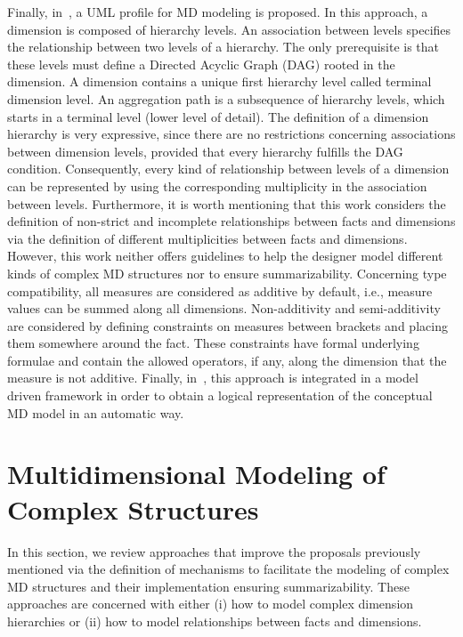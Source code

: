 Finally, in~\cite{DBLP:journals/dke/Lujan-MoraTS06}, a UML profile
for MD modeling is proposed.  In this approach, a dimension is
composed of hierarchy levels.  An association between levels
specifies the relationship between two levels of a hierarchy.  The
only prerequisite is that these levels must define a Directed
Acyclic Graph (DAG) rooted in the dimension. A dimension contains a
unique first hierarchy level called terminal dimension level.  An
aggregation path is a subsequence of hierarchy levels, which starts
in a terminal level (lower level of detail).  The definition of a
dimension hierarchy is very expressive, since there are no
restrictions concerning associations between dimension levels,
provided that every hierarchy fulfills the DAG condition.
Consequently, every kind of relationship between levels of a
dimension can be represented by using the corresponding multiplicity
in the association between levels. Furthermore, it is worth
mentioning that this work considers the definition of non-strict and
incomplete relationships between facts and dimensions via the
definition of different multiplicities between facts and dimensions.
However, this work neither offers guidelines to help the designer
model different kinds of complex MD structures nor to ensure
summarizability.  Concerning type compatibility, all measures are
considered as additive by default, i.e., measure values can be
summed along all dimensions. Non-additivity and semi-additivity are
considered by defining constraints on measures between brackets and
placing them somewhere around the fact. These constraints have
formal underlying formulae and contain the allowed operators, if
any, along the dimension that the measure is not additive.  Finally,
in~\cite{journals/dss/Mazon2008,journals/dke/Mazon2007}, this
approach is integrated in a model driven framework in order to
obtain a logical representation of the conceptual MD model in an
automatic way.

\section{Multidimensional Modeling of Complex Structures}
\label{a1:sec:specific} In this section, we review approaches that
improve the proposals previously mentioned via the definition of
mechanisms to facilitate the modeling of complex MD structures and
their implementation ensuring summarizability. These approaches are
concerned with either (i) how to model complex dimension hierarchies
or (ii) how to model relationships between facts and dimensions.

